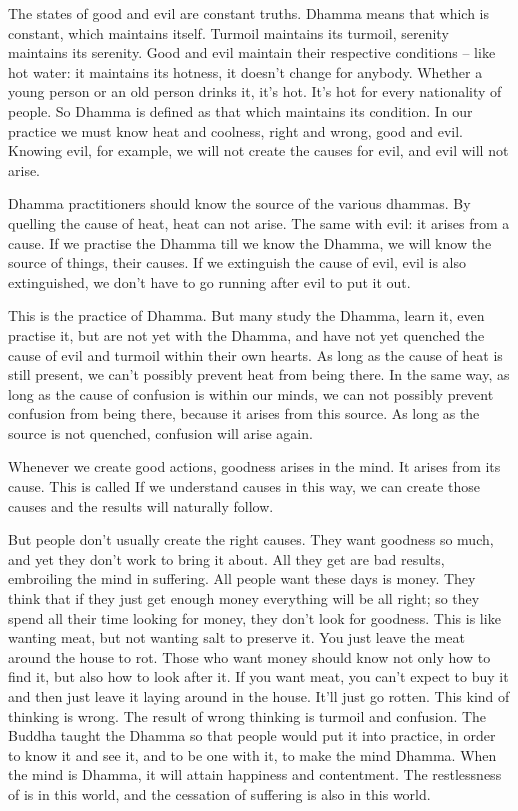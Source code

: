 The states of good and evil are constant truths. Dhamma means that which is constant, which maintains itself. Turmoil maintains its turmoil, serenity maintains its serenity. Good and evil maintain their respective conditions -- like hot water: it maintains its hotness, it doesn't change for anybody. Whether a young person or an old person drinks it, it's hot. It's hot for every nationality of people. So Dhamma is defined as that which maintains its condition. In our practice we must know heat and coolness, right and wrong, good and evil. Knowing evil, for example, we will not create the causes for evil, and evil will not arise. 

Dhamma practitioners should know the source of the various dhammas. By quelling the cause of heat, heat can not arise. The same with evil: it arises from a cause. If we practise the Dhamma till we know the Dhamma, we will know the source of things, their causes. If we extinguish the cause of evil, evil is also extinguished, we don't have to go running after evil to put it out. 

This is the practice of Dhamma. But many study the Dhamma, learn it, even practise it, but are not yet with the Dhamma, and have not yet quenched the cause of evil and turmoil within their own hearts. As long as the cause of heat is still present, we can't possibly prevent heat from being there. In the same way, as long as the cause of confusion is within our minds, we can not possibly prevent confusion from being there, because it arises from this source. As long as the source is not quenched, confusion will arise again. 

Whenever we create good actions, goodness arises in the mind. It arises from its cause. This is called  If we understand causes in this way, we can create those causes and the results will naturally follow. 

But people don't usually create the right causes. They want goodness so much, and yet they don't work to bring it about. All they get are bad results, embroiling the mind in suffering. All people want these days is money. They think that if they just get enough money everything will be all right; so they spend all their time looking for money, they don't look for goodness. This is like wanting meat, but not wanting salt to preserve it. You just leave the meat around the house to rot. Those who want money should know not only how to find it, but also how to look after it. If you want meat, you can't expect to buy it and then just leave it laying around in the house. It'll just go rotten. This kind of thinking is wrong. The result of wrong thinking is turmoil and confusion. The Buddha taught the Dhamma so that people would put it into practice, in order to know it and see it, and to be one with it, to make the mind Dhamma. When the mind is Dhamma, it will attain happiness and contentment. The restlessness of  is in this world, and the cessation of suffering is also in this world. 

